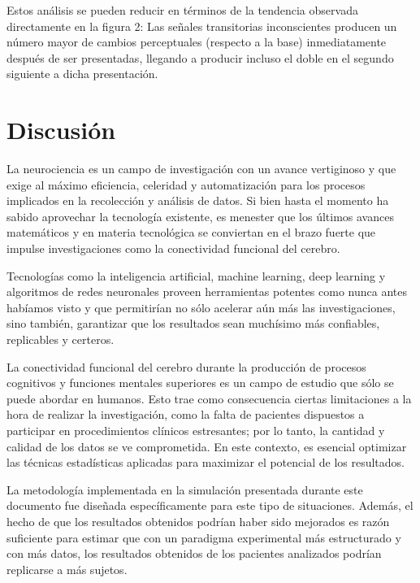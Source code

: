 \documentclass[jou]{apa6}
\begin{document}
Estos análisis se pueden reducir en términos de la tendencia observada directamente en la
figura 2: Las señales transitorias inconscientes producen un número mayor de cambios
perceptuales (respecto a la base) inmediatamente después de ser presentadas, llegando a
producir incluso el doble en el segundo siguiente a dicha presentación.

\section{Discusión}
La neurociencia es un campo de investigación con un avance vertiginoso y que exige al máximo eficiencia, 
celeridad y automatización para los procesos implicados en la recolección y análisis de datos. 
Si bien hasta el momento ha sabido aprovechar la tecnología existente, es menester que los últimos 
avances matemáticos y en materia tecnológica se conviertan en el brazo fuerte que impulse investigaciones 
como la conectividad funcional del cerebro.

Tecnologías como la inteligencia artificial, machine learning, deep learning y algoritmos de redes 
neuronales proveen herramientas potentes como nunca antes habíamos visto y que permitirían no sólo 
acelerar aún más las investigaciones, sino también, garantizar que los resultados sean muchísimo más 
confiables, replicables y certeros.

La conectividad funcional del cerebro durante la producción de procesos cognitivos y funciones 
mentales superiores es un campo de estudio que sólo se puede abordar en humanos. Esto trae como 
consecuencia ciertas limitaciones a la hora de realizar la investigación, como la falta de pacientes 
dispuestos a participar en procedimientos clínicos estresantes; por lo tanto, la cantidad y calidad 
de los datos se ve comprometida. En este contexto, es esencial optimizar las técnicas estadísticas 
aplicadas para maximizar el potencial de los resultados.

La metodología implementada en la simulación presentada durante este documento fue diseñada específicamente 
para este tipo de situaciones. Además, el hecho de que los resultados obtenidos podrían haber sido mejorados 
es razón suficiente para estimar que con un paradigma experimental más estructurado y con más datos, 
los resultados obtenidos de los pacientes analizados podrían replicarse a más sujetos.

\printbibliography
\end{document}
